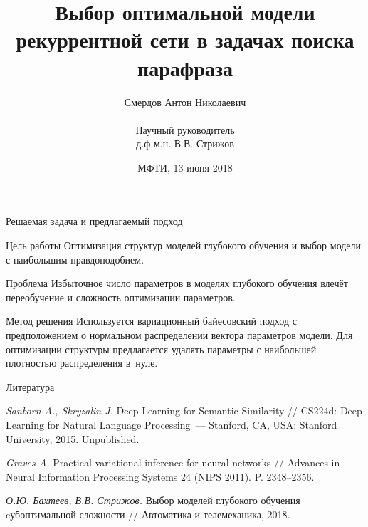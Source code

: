 \documentclass{beamer}
\title[\hbox to 56mm{Выбор оптимальной модели рекуррентной сети\ \  \hfill\insertframenumber\,/\,\inserttotalframenumber}]
{Выбор оптимальной модели рекуррентной сети в задачах поиска парафраза}
\author[А.\,Н. Смердов]{{\large Смердов Антон Николаевич\\~} {\small \\ Научный руководитель \\ д.ф-м.н. В.В. Стрижов}}
\institute[МФТИ]{Московский физико-технический институт \\
	Факультет управления и прикладной математики\\
	Кафедра <<Интеллектуальные системы>>
}
\date{\footnotesize{МФТИ, 13 июня 2018}}
\begin{document}
\begin{frame}
	\titlepage
\end{frame}

\begin{frame}{Решаемая задача и предлагаемый подход}

\begin{block}{Цель работы}
Оптимизация структур моделей глубокого обучения и выбор модели с наибольшим правдоподобием.

\end{block}

\begin{block}{Проблема}
Избыточное число параметров в моделях глубокого обучения влечёт переобучение и сложность оптимизации параметров.
\end{block}

\begin{block}{Метод решения}
Используется вариационный байесовский подход с предположением о нормальном распределении вектора параметров модели. Для оптимизации структуры предлагается удалять параметры с наибольшей плотностью распределения в~нуле.


\end{block}

\end{frame}
\begin{frame}{Литература}
%	
	
\begin{thebibliography}{}
	\textit{Sanborn A., Skryzalin J.} 
	Deep Learning for Semantic Similarity // CS224d: Deep Learning for Natural Language Processing~--- Stanford, CA, USA: Stanford University, 2015. Unpublished.
	
	\textit{Graves A.}
	Practical variational inference for neural networks // Advances in Neural Information Processing Systems 24 (NIPS 2011). P. 2348--2356.
	
	\textit{О.Ю. Бахтеев, В.В. Стрижов.}
	Выбор моделей глубокого обучения cубоптимальной сложности // Автоматика и телемеханика, 2018.
\end{thebibliography}{}
	
\end{frame}
\end{document}
